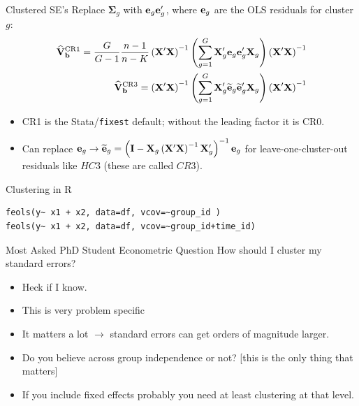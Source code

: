 \documentclass[aspectratio=169,11pt]{beamer}
\begin{document}
\begin{frame}{Clustered SE's}
Replace $\boldsymbol{\Sigma}_g$ with ${\bf e}_g {\bf e}_g'$, where ${\bf e}_g$ are the OLS residuals for cluster $g$:
\begin{align*}
\widehat { {\bf V} } _ { {\bf b} } ^ { \mathrm { CR } 1 } = \frac{G}{G-1}\frac{n-1}{n-K} \left( {\bf X} ^ { \prime } {\bf X} \right) ^ { - 1 } \left( \sum _ { g = 1 } ^ { G } {\bf X} _ { g } ^ { \prime } {\bf e}_ { g }  {\bf e}_ { g } ^ { \prime } {\bf X} _ { g } \right) \left( {\bf X} ^ { \prime } {\bf X} \right) ^ { - 1 }\\
\widehat { {\bf V} } _ { {\bf b} } ^ { \mathrm { CR } 3 } = \left( {\bf X} ^ { \prime } {\bf X} \right) ^ { - 1 } \left( \sum _ { g = 1 } ^ { G } {\bf X} _ { g } ^ { \prime } \widetilde { {\bf e} } _ { g }  \widetilde { {\bf e} } _ { g } ^ { \prime } {\bf X} _ { g } \right) \left( {\bf X} ^ { \prime } {\bf X} \right) ^ { - 1 }
\end{align*}
\begin{itemize}
\item CR1 is the Stata/\texttt{fixest} default; without the leading factor it is CR0.
\item Can replace  ${\bf e}_g  \rightarrow \widetilde{{\bf e}}_g = \left({\bf I} - {\bf X}_g\left({\bf X}'{\bf X}\right)^{-1}{\bf X}_g'\right)^{-1}{\bf e}_g$ for leave-one-cluster-out residuals like $HC3$ (these are called $CR3$).
\end{itemize}
\end{frame}


\begin{frame}[fragile]{Clustering in R}
\begin{lstlisting}
feols(y~ x1 + x2, data=df, vcov=~group_id )
feols(y~ x1 + x2, data=df, vcov=~group_id+time_id)
\end{lstlisting}
\end{frame}



\begin{frame}{Most Asked PhD Student Econometric Question}
 How should I cluster my standard errors?
\begin{itemize}
\item Heck if I know.
\item This is very problem specific
\item It matters a lot $\rightarrow$ standard errors can get orders of magnitude larger.
\item Do you believe across group independence or not? [this is the only thing that matters]
\item If you include \alert{fixed effects} probably you need at least clustering at that level.
\end{itemize}
\end{frame}
\end{document}
